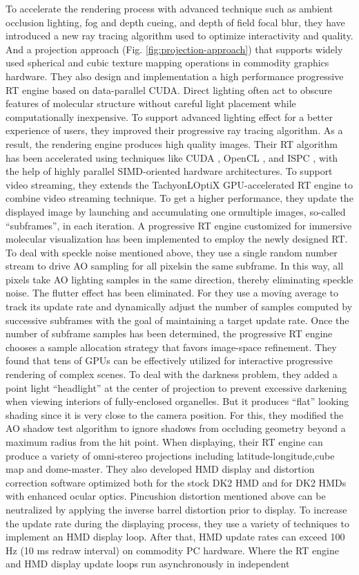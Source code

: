 \documentclass[10pt,twocolumn,letterpaper]{article}
\begin{document}
To accelerate the rendering process with advanced technique such as ambient occlusion lighting, fog and depth cueing, and depth of field focal blur, they have introduced a new ray tracing algorithm used to optimize interactivity and quality. And a projection approach (Fig. \ref{fig:projection-approach}) that supports widely used spherical and cubic texture mapping operations in commodity graphics hardware. They also design and implementation a high performance progressive RT engine based on data-parallel CUDA. Direct lighting often act to obscure features of molecular structure without careful light placement while computationally inexpensive. To support advanced lighting effect for a better experience of users, they improved their progressive ray tracing algorithm. As a result, the rendering engine produces high quality images. Their RT algorithm has been accelerated using techniques like CUDA \cite{Cook:2012}, OpenCL \cite{Munshi:2011}, and ISPC \cite{Pharr2012ispcAS} , with the help of highly parallel SIMD-oriented hardware architectures. To support video streaming, they extends the TachyonLOptiX GPU-accelerated RT engine to combine video streaming technique. To get a higher performance, they update the displayed image by launching and accumulating one ormultiple images, so-called “subframes”, in each iteration. A progressive RT engine customized for immersive molecular visualization has been implemented to employ the newly designed RT. To deal with speckle noise mentioned above, they use a single random number stream to drive AO sampling for all pixelsin the same subframe. In this way, all pixels take AO lighting samples in the same direction, thereby eliminating speckle noise. The flutter effect has been eliminated. For they use a moving average to track its update rate and dynamically adjust the number of samples computed by successive subframes with the goal of maintaining a target update rate. Once the number of subframe samples has been determined, the progressive RT engine chooses a sample allocation strategy that favors image-space refinement. They found that tens of GPUs can be effectively utilized for interactive progressive rendering of complex scenes. To deal with the darkness problem, they added a point light “headlight” at the center of projection to prevent excessive darkening when viewing interiors of fully-enclosed organelles. But it produces “flat” looking shading since it is very close to the camera position. For this, they modified the AO shadow test algorithm to ignore shadows from occluding geometry beyond a maximum radius from the hit point. When displaying, their RT engine can produce a variety of omni-stereo projections including latitude-longitude,cube map and dome-master. They also developed HMD display and distortion correction software optimized both for the stock DK2 HMD and for DK2 HMDs with enhanced ocular optics. Pincushion distortion mentioned above can be neutralized by applying the inverse barrel distortion \cite{ird} prior to display. To increase the update rate during the displaying process, they use a variety of techniques to implement an HMD display loop. After that, HMD update rates can exceed 100 Hz (10 ms redraw interval) on commodity PC hardware. Where the RT engine and HMD display update loops run asynchronously in independent 
\end{document}
